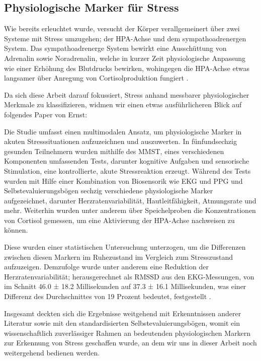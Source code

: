 \subsection{Physiologische Marker für Stress}

Wie bereits erleuchtet wurde, versucht der Körper verallgemeinert über zwei Systeme mit Stress umzugehen; der \ac{HPA-Achse} und dem sympathoadrenergen System. Das sympathoadrenerge System bewirkt eine Ausschüttung von Adrenalin sowie Noradrenalin, welche in kurzer Zeit physiologische Anpassung wie einer Erhöhung des Blutdrucks bewirken, wohingegen die \ac{HPA-Achse} etwas langsamer über Anregung von Cortisolproduktion fungiert \cite{Kaiser2023}.

Da sich diese Arbeit darauf fokussiert, Stress anhand messbarer physiologischer Merkmale zu klassifizieren, widmen wir einen etwas ausführlicheren Blick auf folgendes Paper von Ernst:

Die Studie umfasst einen multimodalen Ansatz, um physiologische Marker in akuten Stresssituationen aufzuzeichnen und auszuwerten. In fünfundsechzig gesunden Teilnehmern wurden mithilfe des \ac{MMST}, eines verschiedenen Komponenten umfassenden Tests, darunter kognitive Aufgaben und sensorische Stimulation, eine kontrollierte, akute Stressreaktion erzeugt. Während des Tests wurden mit Hilfe einer Kombination von Biosensorik wie \ac{EKG} und \ac{PPG} und Selbstevaluierungsbögen sechzig verschiedene physiologische Marker aufgezeichnet, darunter Herzratenvariabilität, Hautleitfähigkeit, Atmungsrate und mehr. Weiterhin wurden unter anderem über Speichelproben die Konzentrationen von Cortisol gemessen, um eine Aktivierung der \ac{HPA-Achse} nachweisen zu können.

Diese wurden einer statistischen Untersuchung unterzogen, um die Differenzen zwischen diesen Markern im Ruhezustand im Vergleich zum Stresszustand aufzuzeigen. Demzufolge wurde unter anderem eine Reduktion der Herzratenvariabilität; herausgerechnet als \ac{RMSSD} aus den \ac{EKG}-Messungen, von im Schnitt 46.0 ± 18.2 Millisekunden auf 37.3 ± 16.1 Millisekunden, was einer Differenz des Durchschnittes von 19 Prozent bedeutet, festgestellt \cite{Ernst2023}.

Insgesamt deckten sich die Ergebnisse weitgehend mit Erkenntnissen anderer Literatur sowie mit den standardisierten Selbstevaluierungsbögen, womit ein wissenschaftlich zuverlässiger Rahmen an bedeutenden physiologischen Markern zur Erkennung von Stress geschaffen wurde, an dem wir uns in dieser Arbeit noch weitergehend bedienen werden.

